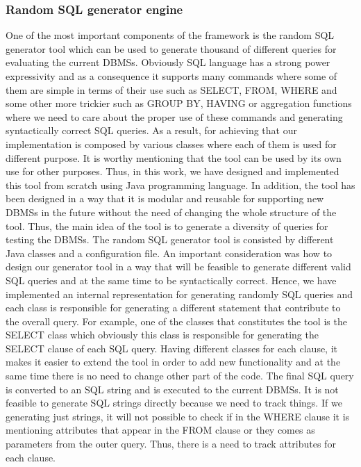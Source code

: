 \subsubsection{Random SQL generator engine}
One of the most important components of the framework is the random SQL generator tool which can be used to generate thousand of different queries for evaluating the current DBMSs. Obviously SQL language has a strong power expressivity and as a consequence it supports many commands where some of them are simple in terms of their use such as SELECT, FROM, WHERE and some other more trickier such as GROUP BY, HAVING or aggregation functions where we need to care about the proper use of these commands and generating syntactically correct SQL queries. As a result, for achieving that our implementation is composed by various classes where each of them is used for different purpose. It is worthy mentioning that the tool can be used by its own use for other purposes. Thus, in this work, we have designed and implemented this tool from scratch using Java programming language. In addition, the tool has been designed in a way that it is modular and reusable for supporting new DBMSs in the future without the need of changing the whole structure of the tool. Thus, the main idea of the tool is to generate a diversity of queries for testing the DBMSs.  
The random SQL generator tool is consisted by different Java classes and a configuration file. An important consideration was how to design our generator tool in a way that will be feasible to generate different valid SQL queries and at the same time to be syntactically correct. Hence, we have implemented an internal representation for generating randomly SQL queries and each class is responsible for generating a different statement  that contribute to the overall query. For example, one of the classes that constitutes the tool is the SELECT class which obviously this class is responsible for generating the SELECT clause of each SQL query. Having different classes for each clause, it makes it easier to extend the tool in order to add new functionality and at the same time there is no need to change other part of the code. The final SQL query is converted to an SQL string and is executed to the current DBMSs. It is not feasible to generate SQL strings directly because we need to track things. If we generating just strings, it will not possible to check if in the WHERE clause it is mentioning attributes that appear in the FROM clause or they comes as parameters from the outer query. Thus, there is a need to track attributes for each clause. 
